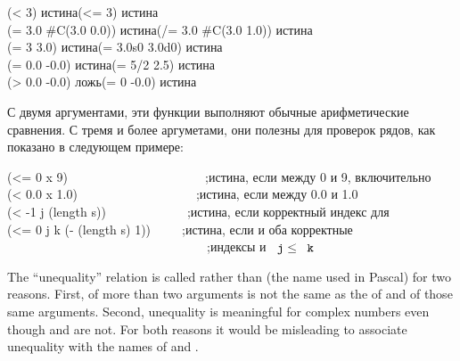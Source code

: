 \begin{defun}[Function]
\begin{lisp}
(< 3) \textrm{истина}\>(<= 3) \textrm{истина} \\
(= 3.0 \#C(3.0 0.0)) \textrm{истина}\>(/= 3.0 \#C(3.0 1.0)) \textrm{истина} \\
(= 3 3.0) \textrm{истина}\>(= 3.0s0 3.0d0) \textrm{истина} \\
(= 0.0 -0.0) \textrm{истина}\>(= 5/2 2.5) \textrm{истина} \\
(> 0.0 -0.0) \textrm{ложь}\>(= 0 -0.0) \textrm{истина}
\end{lisp}
С двумя аргументами, эти функции выполняют обычные арифметические сравнения.
С тремя и более аргуметами, они полезны для проверок рядов, как показано в
следующем примере:
\begin{lisp}
(<= 0 x 9)~~~~~~~~~~~~~~~~~~~~~~;\textrm{истина, если  между 0 и 9, включительно} \\
(< 0.0 x 1.0)~~~~~~~~~~~~~~~~~~~;\textrm{истина, если  между 0.0 и 1.0} \\
(< -1 j (length s))~~~~~~~~~~~~~;\textrm{истина, если  корректный индекс для } \\
(<= 0 j k (- (length s) 1))~~~~~;\textrm{истина, если  и  оба корректные} \\
~~~~~~~~~~~~~~~~~~~~~~~~~~~~~~~~;\textrm{индексы  и $\cdf{j}\leq\cdf{k}$}
\end{lisp}

\beforenoterule
\begin{rationale}
The ``unequality'' relation is called \cdf{/=} rather than
\cd{<>}
(the name used in Pascal) for two reasons.  First, \cdf{/=} of more than two
arguments is not the same as the  of \cdf{<} and \cdf{>} of those same
arguments.  Second, unequality is meaningful for complex numbers even though
\cdf{<} and \cdf{>} are not.  For both reasons it would be misleading to
associate unequality with the names of \cdf{<} and \cdf{>}.
\end{rationale}
\afternoterule
\end{defun}

